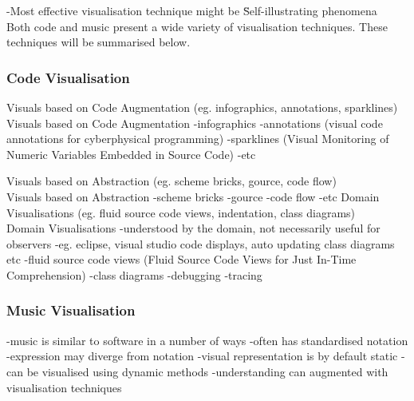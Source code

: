 -Most effective visualisation technique might be \"Self-illustrating phenomena\" \\

Both code and music present a wide variety of visualisation techniques. These techniques will be summarised below.


\subsubsection{Code Visualisation}

Visuals based on Code Augmentation (eg. infographics, annotations, sparklines)\\
Visuals based on Code Augmentation
-infographics
-annotations (visual code annotations for cyberphysical programming)
-sparklines (Visual Monitoring of Numeric Variables Embedded in Source Code)
-etc

Visuals based on Abstraction (eg. scheme bricks, gource, code flow)\\

Visuals based on Abstraction
-scheme bricks
-gource
-code flow
-etc
Domain Visualisations (eg. fluid source code views, indentation, class diagrams)\\

Domain Visualisations
-understood by the domain, not necessarily useful for observers
-eg. eclipse, visual studio code displays, auto updating class diagrams etc
-fluid source code views (Fluid Source Code Views for Just In-Time Comprehension)
-class diagrams
-debugging
-tracing

\subsubsection{Music Visualisation}
-music is similar to software in a number of ways
-often has standardised notation
-expression may diverge from notation
-visual representation is by default static
-can be visualised using dynamic methods
-understanding can augmented with visualisation techniques

